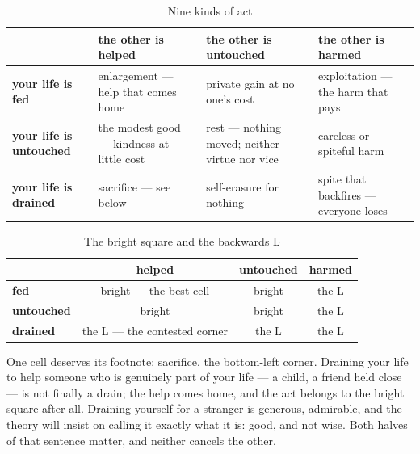 \documentclass[../main_explainer]{subfiles}
\begin{document}
\begin{table}[htbp]
  \centering
  \caption{Nine kinds of act}
  \label{xtbl:L}
  \begin{tabularx}{\textwidth}{@{} >{\RaggedRight\arraybackslash}p{} L L L @{}}
    \toprule
    & \textbf{the other is helped} & \textbf{the other is untouched}
      & \textbf{the other is harmed} \\
    \midrule
    \textbf{your life is fed}
      & enlargement --- help that comes home
      & private gain at no one's cost
      & exploitation --- the harm that pays \\
    \addlinespace
    \textbf{your life is untouched}
      & the modest good --- kindness at little cost
      & rest --- nothing moved; neither virtue nor vice
      & careless or spiteful harm \\
    \addlinespace
    \textbf{your life is drained}
      & sacrifice --- see below
      & self-erasure for nothing
      & spite that backfires --- everyone loses \\
    \bottomrule
  \end{tabularx}
\end{table}

\begin{table}[htbp]
  \centering
  \caption{The bright square and the backwards L}
  \label{xtbl:backL}
  \begin{tabularx}{\textwidth}{@{} >{\RaggedRight\arraybackslash}p{} C C C @{}}
    \toprule
    & \textbf{helped} & \textbf{untouched} & \textbf{harmed} \\
    \midrule
    \textbf{fed}       & bright --- the best cell & bright & the L \\
    \addlinespace
    \textbf{untouched} & bright & bright & the L \\
    \addlinespace
    \textbf{drained}   & the L --- the contested corner & the L & the L \\
    \bottomrule
  \end{tabularx}
\end{table}

One cell deserves its footnote: sacrifice, the bottom-left corner. Draining your life to
help someone who is genuinely part of your life --- a child, a friend held close --- is
not finally a drain; the help comes home, and the act belongs to the bright square after
all. Draining yourself for a stranger is generous, admirable, and the theory will insist
on calling it exactly what it is: good, and not wise. Both halves of that sentence
matter, and neither cancels the other.
\end{document}
